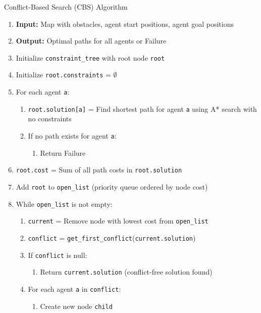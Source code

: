\begin{algorithm}
\caption{Conflict-Based Search (CBS) Algorithm}
\label{alg:cbs}
\begin{enumerate}
    \item \textbf{Input:} Map with obstacles, agent start positions, agent goal positions
    \item \textbf{Output:} Optimal paths for all agents or Failure
    \item Initialize \texttt{constraint\_tree} with root node \texttt{root}
    \item Initialize \texttt{root.constraints} = $\emptyset$
    \item For each agent \texttt{a}:
        \begin{enumerate}
            \item \texttt{root.solution[a]} = Find shortest path for agent \texttt{a} using A* search with no constraints
            \item If no path exists for agent \texttt{a}:
                \begin{enumerate}
                    \item Return Failure
                \end{enumerate}
        \end{enumerate}
    \item \texttt{root.cost} = Sum of all path costs in \texttt{root.solution}
    \item Add \texttt{root} to \texttt{open\_list} (priority queue ordered by node cost)
    \item While \texttt{open\_list} is not empty:
        \begin{enumerate}
            \item \texttt{current} = Remove node with lowest cost from \texttt{open\_list}
            \item \texttt{conflict} = \texttt{get\_first\_conflict}(\texttt{current.solution})
            \item If \texttt{conflict} is null:
                \begin{enumerate}
                    \item Return \texttt{current.solution} (conflict-free solution found)
                \end{enumerate}
            \item For each agent \texttt{a} in \texttt{conflict}:
                \begin{enumerate}
                    \item Create new node \texttt{child}

\end{enumerate}
\end{enumerate}
\end{enumerate}
\end{algorithm}

